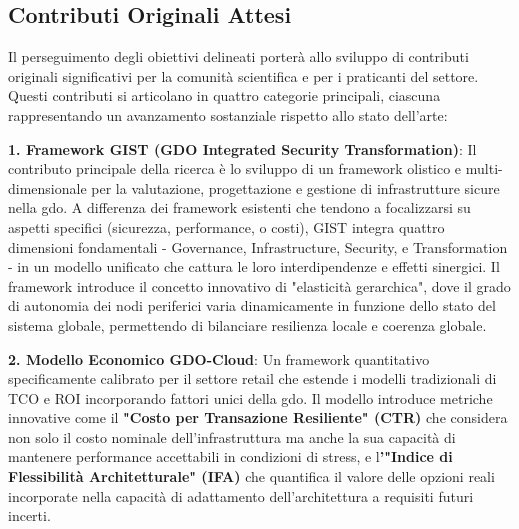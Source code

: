 
\subsection{Contributi Originali Attesi}

\label{ssec:contributi_originali}
Il perseguimento degli obiettivi delineati porterà allo sviluppo di contributi originali significativi per la comunità scientifica e per i praticanti del settore. Questi contributi si articolano in quattro categorie principali, ciascuna rappresentando un avanzamento sostanziale rispetto allo stato dell'arte:

\textbf{1. Framework GIST (GDO Integrated Security Transformation)}: Il contributo principale della ricerca è lo sviluppo di un framework olistico e multi-dimensionale per la valutazione, progettazione e gestione di infrastrutture sicure nella \gls{gdo}. A differenza dei framework esistenti che tendono a focalizzarsi su aspetti specifici (sicurezza, performance, o costi), GIST integra quattro dimensioni fondamentali - Governance, Infrastructure, Security, e Transformation - in un modello unificato che cattura le loro interdipendenze e effetti sinergici. Il framework introduce il concetto innovativo di "elasticità gerarchica", dove il grado di autonomia dei nodi periferici varia dinamicamente in funzione dello stato del sistema globale, permettendo di bilanciare resilienza locale e coerenza globale.

\textbf{2. Modello Economico GDO-Cloud}: Un framework quantitativo specificamente calibrato per il settore retail che estende i modelli tradizionali di TCO e ROI incorporando fattori unici della \gls{gdo}. Il modello introduce metriche innovative come il\textbf{ "Costo per Transazione Resiliente" (CTR)} che considera non solo il costo nominale dell'infrastruttura ma anche la sua capacità di mantenere performance accettabili in condizioni di stress, e l\textbf{'"Indice di Flessibilità Architetturale" (IFA)} che quantifica il valore delle opzioni reali incorporate nella capacità di adattamento dell'architettura a requisiti futuri incerti.

